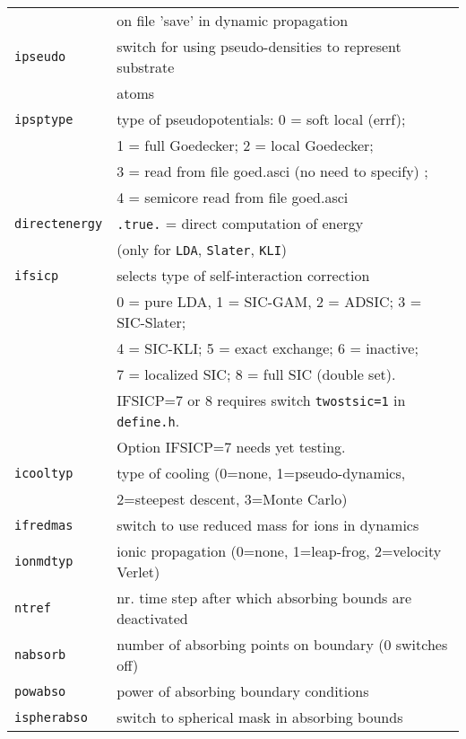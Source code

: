 \documentclass[12pt]{article}
\begin{document}
\begin{tabular}{ll}
{\tt                  }& on file 'save' in dynamic propagation\\
{\tt ipseudo          }& switch for using pseudo-densities to represent substrate\\
{\tt                  }& atoms \\
{\tt ipsptype         }& type of pseudopotentials: 0 = soft local (errf);\\
                       & 1 = full Goedecker; 2 = local Goedecker;\\
                       & 3 = read from file goed.asci (no need to specify)  ;\\
                       & 4 = semicore read from file goed.asci\\
{\tt directenergy}   & {\tt .true.} = direct computation of energy \\
                       & (only for {\tt LDA}, {\tt Slater}, {\tt KLI})\\
{\tt ifsicp           }& selects type of self-interaction correction\\
    &  0 = pure LDA, 1 = SIC-GAM, 2 = ADSIC; 3 = SIC-Slater; \\
    &  4 = SIC-KLI; 5 = exact exchange; 6 = inactive;\\
    &  7 = localized SIC;  8 = full SIC (double set).\\
    & IFSICP=7 or 8 requires switch
     {\tt twostsic=1} in {\tt define.h}.\\
    & Option IFSICP=7 needs yet testing.\\
{\tt icooltyp         }& type of cooling (0=none, 1=pseudo-dynamics,\\
{\tt                  }& 2=steepest descent, 3=Monte Carlo)\\
{\tt ifredmas         }& switch to use reduced mass for ions in dynamics\\
{\tt ionmdtyp         }& ionic propagation
                         (0=none, 1=leap-frog, 2=velocity Verlet)\\
{\tt ntref}& nr. time step after which absorbing bounds are deactivated
\\
{\tt nabsorb}          & number of absorbing points on boundary (0 switches off) 
\\
{\tt powabso}          & power of absorbing boundary conditions
\\
{\tt ispherabso}       & switch to spherical mask in absorbing bounds
\\
\hline
\end{tabular}
\end{document}
